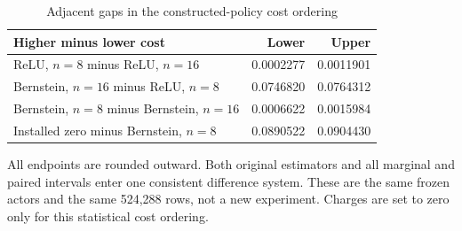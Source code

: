 \begin{table}[htbp]
\centering
\caption{Adjacent gaps in the constructed-policy cost ordering}\label{tab:ordering78}
{\small\setlength{\tabcolsep}{4pt}
\begin{tabular}{lrr}
\hline
Higher minus lower cost & Lower & Upper \\
\hline
ReLU, $n=8$ minus ReLU, $n=16$ & 0.0002277 & 0.0011901 \\
Bernstein, $n=16$ minus ReLU, $n=8$ & 0.0746820 & 0.0764312 \\
Bernstein, $n=8$ minus Bernstein, $n=16$ & 0.0006622 & 0.0015984 \\
Installed zero minus Bernstein, $n=8$ & 0.0890522 & 0.0904430 \\
\hline
\end{tabular}}
\par\smallskip
{\footnotesize All endpoints are rounded outward. Both original estimators and all marginal and paired intervals enter one consistent difference system. These are the same frozen actors and the same 524,288 rows, not a new experiment. Charges are set to zero only for this statistical cost ordering.}
\end{table}
